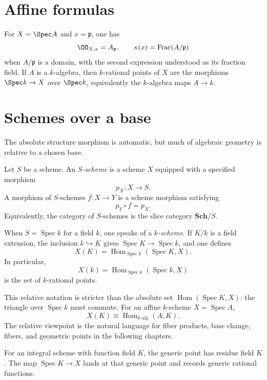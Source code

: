 \section{Affine formulas}
For $X=\Spec A$ and $x=\mathfrak p$, one has
\[
 \OO_{X,x}=A_{\mathfrak p},\qquad
 \kappa(x)=\operatorname{Frac}(A/\mathfrak p)
\]
when $A/\mathfrak p$ is a domain, with the second expression understood as its fraction field.
If $A$ is a $k$-algebra, then $k$-rational points of $X$ are the morphisms
$\Spec k\to X$ over $\Spec k$, equivalently the $k$-algebra maps $A\to k$.



\section{Schemes over a base}\label{sec:vi21-schemes-over-base}
The absolute structure morphism is automatic, but much of algebraic geometry is relative to a chosen base.

\begin{definition}[$S$-scheme]
Let $S$ be a scheme.  An \emph{$S$-scheme} is a scheme $X$ equipped with a specified morphism
\[
p_X:X\longrightarrow S.
\]
A morphism of $S$-schemes $f:X\to Y$ is a scheme morphism satisfying
\[
p_Y\circ f=p_X.
\]
Equivalently, the category of $S$-schemes is the slice category $\mathbf{Sch}/S$.
\end{definition}

When $S=\operatorname{Spec}k$ for a field $k$, one speaks of a \emph{$k$-scheme}.  If $K/k$ is a field extension, the inclusion $k\hookrightarrow K$ gives $\operatorname{Spec}K\to\operatorname{Spec}k$, and one defines
\[
\boxed{X(K)=\operatorname{Hom}_{\operatorname{Spec}k}(\operatorname{Spec}K,X).}
\]
In particular,
\[
X(k)=\operatorname{Hom}_{\operatorname{Spec}k}(\operatorname{Spec}k,X)
\]
is the set of $k$-rational points.

This relative notation is stricter than the absolute set $\operatorname{Hom}(\operatorname{Spec}K,X)$: the triangle over $\operatorname{Spec}k$ must commute.  For an affine $k$-scheme $X=\operatorname{Spec}A$,
\[
X(K)\cong\operatorname{Hom}_{k\text{-alg}}(A,K).
\]
The relative viewpoint is the natural language for fiber products, base change, fibers, and geometric points in the following chapters.
\begin{example}\label{ex:vi21-expand-03}
For an integral scheme with function field $K$, the generic point has residue field $K$.  The map $\operatorname{Spec}K\to X$ lands at that generic point and records generic rational functions.
\end{example}
